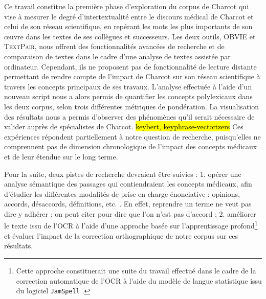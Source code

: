 



Ce travail constitue la première phase d'exploration du corpus de Charcot qui vise à mesurer le degré d'intertextualité entre le discours médical de Charcot et celui de son réseau scientifique, en repérant les mots les plus importants de son \oe{}uvre dans les textes de ses collègues et successeurs. Les deux outils, \textsc{OBVIE} et \textsc{TextPair}, nous offrent des fonctionnalités avancées de recherche et de comparaison de textes dans le cadre d'une analyse de textes assistée par ordinateur. Cependant, ils ne proposent pas de fonctionnalité de lecture distante permettant de rendre compte de l'impact de Charcot sur son réseau scientifique à travers les concepts principaux de ses travaux. L'analyse effectuée à l'aide d'un nouveau script nous a alors permis de quantifier les concepts polylexicaux dans les deux corpus, selon trois différentes métriques de pondération. La visualisation des résultats nous a permis d'observer des phénomènes qu'il serait nécessaire de valider auprès de spécialistes de Charcot. \hl{keybert, keyphrase-vectorizers} Ces expériences répondent partiellement à notre question de recherche, puisqu'elles ne comprennent pas de dimension chronologique de l'impact des concepts médicaux et de leur étendue sur le long terme. 

Pour la suite, deux pistes de recherche devraient être suivies : 1. opérer une analyse sémantique des passages qui contiendraient les concepts médicaux, afin d'étudier les différentes modalités de prise en charge énonciative : opinions, accords, désaccords, définitions, etc. \citep{alrahabi2021ariane}. En effet, reprendre un terme ne veut pas dire y adhérer : on peut citer pour dire que l'on
n'est pas d'accord ;  2. améliorer le texte issu de l'\textsc{OCR} à l'aide d'une approche basée sur l'apprentissage profond\footnote{Cette approche constituerait une suite du travail effectué dans le cadre de la correction automatique de l'\textsc{OCR} à l'aide du modèle de langue statistique issu du logiciel \texttt{JamSpell} \citep{petkovic2022impact}.} et évaluer l'impact de la correction orthographique de notre corpus sur ces résultats.



